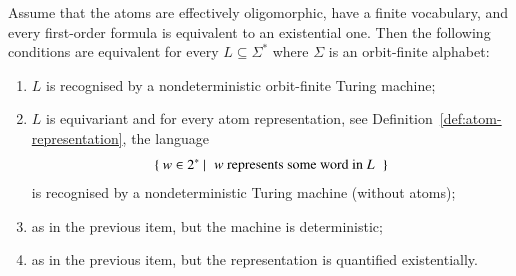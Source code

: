 \begin{theorem}\label{thm:nondeterministic-turing-completeness}
	Assume that the atoms are effectively oligomorphic, have a finite vocabulary, and every first-order formula is equivalent to an existential one.  Then the following conditions are equivalent for every $L \subseteq \Sigma^*$ where $\Sigma$ is an orbit-finite alphabet: 
    \begin{enumerate}
        \item \label{item:turing-of-nondeterministic-pof} $L$ is recognised by a nondeterministic orbit-finite  Turing machine;
        \item \label{item:turing-of-every-rep} $L$ is equivariant and for every atom representation, see Definition~\ref{def:atom-representation},  the language
        \begin{align*}
        \setbuild{ w \in 2^*}{ $w$ represents  some word in $L$}
        \end{align*}
         is recognised by a  nondeterministic   Turing machine (without atoms);
        \item \label{item:turing-of-every-rep-det} as in the previous item, but the machine is deterministic;
        \item \label{item:turing-of-some-rep} as in the previous item, but the representation is quantified existentially.
    \end{enumerate}
\end{theorem}
